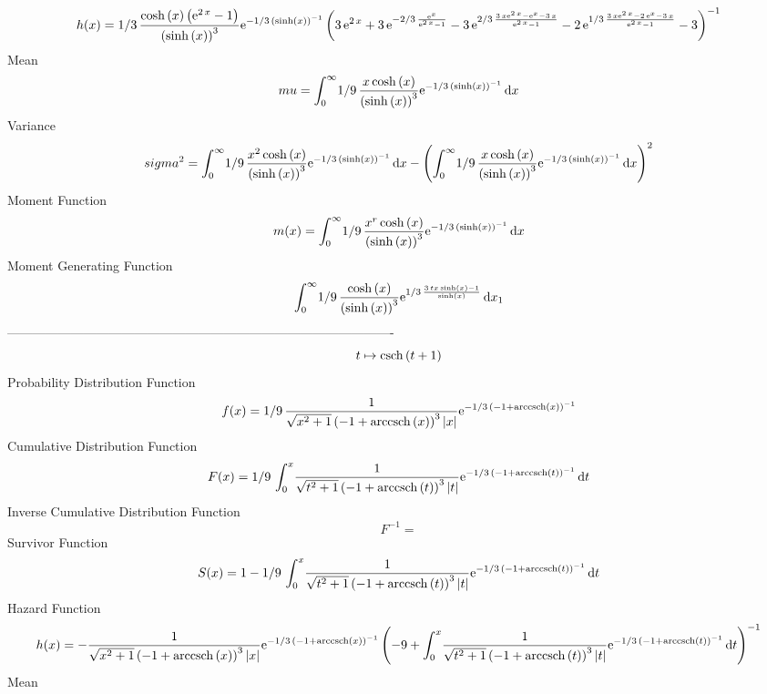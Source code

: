 \documentclass[12pt]{article}
\begin{document}
 $$ h(x)=1/3\,{\frac {\cosh \left( x \right)  \left( {{\rm e}^{2\,x}}-1
 \right) }{ \left( \sinh \left( x \right)  \right) ^{3}}{{\rm e}^{-1/3
\, \left( \sinh \left( x \right)  \right) ^{-1}}} \left( 3\,{{\rm e}^{
2\,x}}+3\,{{\rm e}^{-2/3\,{\frac {{{\rm e}^{x}}}{{{\rm e}^{2\,x}}-1}}}
}-3\,{{\rm e}^{2/3\,{\frac {3\,x{{\rm e}^{2\,x}}-{{\rm e}^{x}}-3\,x}{{
{\rm e}^{2\,x}}-1}}}}-2\,{{\rm e}^{1/3\,{\frac {3\,x{{\rm e}^{2\,x}}-2
\,{{\rm e}^{x}}-3\,x}{{{\rm e}^{2\,x}}-1}}}}-3 \right) ^{-1}}
$$Mean 
 $$ mu=\int_{0}^{\infty }\!1/9\,{\frac {x\cosh \left( x \right) }{ \left( 
\sinh \left( x \right)  \right) ^{3}}{{\rm e}^{-1/3\, \left( \sinh
 \left( x \right)  \right) ^{-1}}}}\,{\rm d}x
$$ Variance 
 $$ sigma^2 = \int_{0}^{\infty }\!1/9\,{\frac {{x}^{2}\cosh \left( x \right) }{
 \left( \sinh \left( x \right)  \right) ^{3}}{{\rm e}^{-1/3\, \left( 
\sinh \left( x \right)  \right) ^{-1}}}}\,{\rm d}x- \left( \int_{0}^{
\infty }\!1/9\,{\frac {x\cosh \left( x \right) }{ \left( \sinh \left( 
x \right)  \right) ^{3}}{{\rm e}^{-1/3\, \left( \sinh \left( x
 \right)  \right) ^{-1}}}}\,{\rm d}x \right) ^{2}
$$Moment Function 
 $$ m(x) = \int_{0}^{\infty }\!1/9\,{\frac {{x}^{r}\cosh \left( x \right) }{
 \left( \sinh \left( x \right)  \right) ^{3}}{{\rm e}^{-1/3\, \left( 
\sinh \left( x \right)  \right) ^{-1}}}}\,{\rm d}x
$$ Moment Generating Function 
 $$\int_{0}^{\infty }\!1/9\,{\frac {\cosh \left( x \right) }{ \left( 
\sinh \left( x \right)  \right) ^{3}}{{\rm e}^{1/3\,{\frac {3\,tx\sinh
 \left( x \right) -1}{\sinh \left( x \right) }}}}}\,{\rm d}x_{{1}}
$$-------------------------------------------------------------------------------------------  \\$$t\mapsto {\rm csch} \left(t+1\right)
$$Probability Distribution Function 
$$  f(x)=1/9\,{\frac {1}{\sqrt {{x}^{2}+1} \left( -1+{\rm arccsch} \left(x
\right) \right) ^{3} \left| x \right| }{{\rm e}^{-1/3\, \left( -1+
{\rm arccsch} \left(x\right) \right) ^{-1}}}}
$$Cumulative Distribution Function  
 $$F(x)=1/9\,\int_{0}^{x}\!{\frac {1}{\sqrt {{t}^{2}+1} \left( -1+
{\rm arccsch} \left(t\right) \right) ^{3} \left| t \right| }{{\rm e}^{
-1/3\, \left( -1+{\rm arccsch} \left(t\right) \right) ^{-1}}}}
\,{\rm d}t
$$ Inverse Cumulative Distribution Function 
  $$F^{-1} = $$Survivor Function 
 $$ S(x)=1-1/9\,\int_{0}^{x}\!{\frac {1}{\sqrt {{t}^{2}+1} \left( -1+
{\rm arccsch} \left(t\right) \right) ^{3} \left| t \right| }{{\rm e}^{
-1/3\, \left( -1+{\rm arccsch} \left(t\right) \right) ^{-1}}}}
\,{\rm d}t
$$ Hazard Function 
 $$ h(x)=-{\frac {1}{\sqrt {{x}^{2}+1} \left( -1+{\rm arccsch} \left(x\right)
 \right) ^{3} \left| x \right| }{{\rm e}^{-1/3\, \left( -1+
{\rm arccsch} \left(x\right) \right) ^{-1}}} \left( -9+\int_{0}^{x}\!{
\frac {1}{\sqrt {{t}^{2}+1} \left( -1+{\rm arccsch} \left(t\right)
 \right) ^{3} \left| t \right| }{{\rm e}^{-1/3\, \left( -1+
{\rm arccsch} \left(t\right) \right) ^{-1}}}}\,{\rm d}t \right) ^{-1}}
$$Mean 
\end{document}
